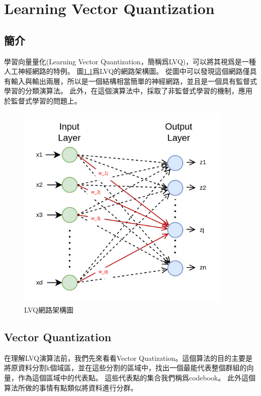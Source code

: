 \chapter{Learning Vector Quantization}
\label{chapter:intro}
\section{簡介}


	學習向量量化(Learning Vector Quantization，簡稱爲LVQ)，可以將其視爲是一種人工神經網路的特例。
	圖\ref{fig:lvq_network}爲LVQ的網路架構圖。
	從圖中可以發現這個網路僅具有輸入與輸出兩層，所以是一個結構相當簡單的神經網路，並且是一個具有監督式學習的分類演算法。
	此外，在這個演算法中，採取了非監督式學習的機制，應用於監督式學習的問題上。

	\begin{figure}[h]
			\centering
			\includegraphics[height=10cm]{./pic/zMBsAkkS.png}
			\caption{LVQ網路架構圖}
			\label{fig:lvq_network}
	\end{figure}

\label{sec:background}


    \section{Vector Quantization}
		在理解LVQ演算法前，我們先來看看Vector Quatization。這個算法的目的主要是將原資料分割k個域區，並在這些分割的區域中，找出一個最能代表整個群組的向量，作為這個區域中的代表點。
		這些代表點的集合我們稱爲codebook。
		此外這個算法所做的事情有點類似將資料進行分群。



